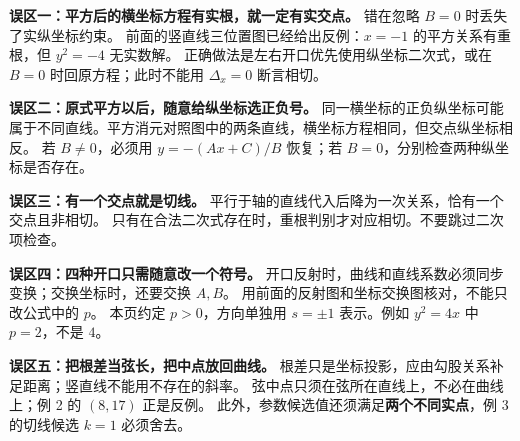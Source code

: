 \begin{trapbox}
\textbf{误区一：平方后的横坐标方程有实根，就一定有实交点。}
错在忽略 $B=0$ 时丢失了实纵坐标约束。
前面的竖直线三位置图已经给出反例：$x=-1$ 的平方关系有重根，但 $y^2=-4$ 无实数解。
正确做法是左右开口优先使用纵坐标二次式，或在 $B=0$ 时回原方程；此时不能用 $\Delta_x=0$ 断言相切。

\textbf{误区二：原式平方以后，随意给纵坐标选正负号。}
同一横坐标的正负纵坐标可能属于不同直线。平方消元对照图中的两条直线，横坐标方程相同，但交点纵坐标相反。
若 $B\ne0$，必须用 $y=-(Ax+C)/B$ 恢复；若 $B=0$，分别检查两种纵坐标是否存在。

\textbf{误区三：有一个交点就是切线。}
平行于轴的直线代入后降为一次关系，恰有一个交点且非相切。
只有在合法二次式存在时，重根判别才对应相切。不要跳过二次项检查。

\textbf{误区四：四种开口只需随意改一个符号。}
开口反射时，曲线和直线系数必须同步变换；交换坐标时，还要交换 $A,B$。
用前面的反射图和坐标交换图核对，不能只改公式中的 $p$。
本页约定 $p>0$，方向单独用 $s=\pm1$ 表示。例如 $y^2=4x$ 中 $p=2$，不是 $4$。

\textbf{误区五：把根差当弦长，把中点放回曲线。}
根差只是坐标投影，应由勾股关系补足距离；竖直线不能用不存在的斜率。
弦中点只须在弦所在直线上，不必在曲线上；例 2 的 $(8,17)$ 正是反例。
此外，参数候选值还须满足\textbf{两个不同实点}，例 3 的切线候选 $k=1$ 必须舍去。
\end{trapbox}
\clearpage
